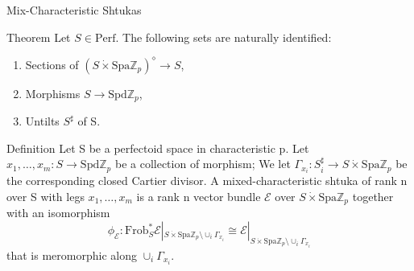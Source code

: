 \documentclass[aspectratio=1610]{ctexbeamer}
\def  \Frob     {\mathrm{Frob}}
\def  \Perf     {\mathrm{Perf}}
\def  \Spa      {\mathrm{Spa}}
\def  \ce       {\mathcal{E}}
\def  \bz       {\mathbb{Z}}
\begin{document}
\begin{frame}{Mix-Characteristic Shtukas}

\begin{alertblock}{Theorem}
	Let $S \in \Perf$. The following sets are naturally identified:
	\begin{enumerate}
		\item Sections of $(S \dot{\times}  \Spa \bz_p)^{\diamond} \to S$,
		\item Morphisms $S \to \mathrm{Spd} \bz_p$,
		\item Untilts $S^{\sharp}$ of S.
	\end{enumerate}
\end{alertblock}





\begin{block}{Definition}
	Let S be a perfectoid space in characteristic p. Let $x_1, \dots, x_m: S\to  \mathrm{Spd} \bz_p$ be a collection of morphism; We let $\Gamma_{x_i}: S^{\sharp}_i  \to  S \dot{\times} \Spa \bz_p$ be the corresponding closed Cartier divisor. A mixed-characteristic shtuka of rank n over S with legs $x_1, \dots, x_m$ is a rank n vector bundle $\ce$ over $S \dot{\times} \Spa \bz_p$ together with an isomorphism
	$$
	\phi_{\mathcal{E}}: \Frob_S^*  \ce |_{S \dot{\times} \Spa \bz_p  \setminus \cup_i \Gamma_{x_i}}  \cong \ce |_{S \dot{\times} \Spa \bz_p \setminus \cup_i \Gamma_{x_i}}
	$$
	that is meromorphic along $\cup_i \Gamma_{x_i}$.
\end{block}

\end{frame}
\end{document}
